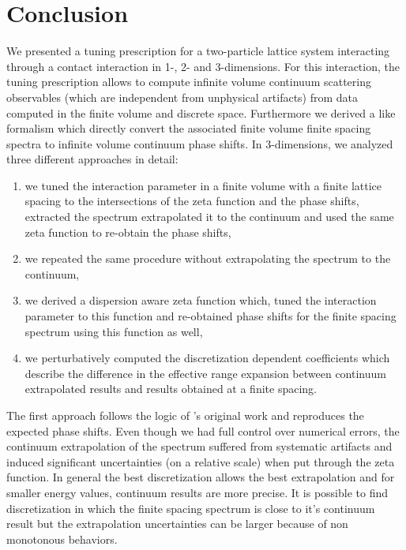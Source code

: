 \section{Conclusion}\label{sec:conclusion}

We presented a tuning prescription for a two-particle lattice system interacting through a contact interaction in 1-, 2- and 3-dimensions.
For this interaction, the tuning prescription allows to compute infinite volume continuum scattering observables (which are independent from unphysical artifacts) from data computed in the finite volume and discrete space.
Furthermore we derived a \Luscher like formalism which directly convert the associated finite volume finite spacing spectra to infinite volume continuum phase shifts.
In 3-dimensions, we analyzed three different approaches in detail:
\begin{enumerate}
	\item we tuned the interaction parameter in a finite volume with a finite lattice spacing to the intersections of the \Luscher zeta function and the phase shifts, extracted the spectrum extrapolated it to the continuum and used the same \Luscher zeta function to re-obtain the phase shifts,
	\item we repeated the same procedure without extrapolating the spectrum to the continuum,
	\item we derived a dispersion aware zeta function which, tuned the interaction parameter to this function and re-obtained phase shifts for the finite spacing spectrum using this function as well,
	\item we perturbatively computed the discretization dependent coefficients which describe the difference in the effective range expansion between continuum extrapolated results and results obtained at a finite spacing.
\end{enumerate}

The first approach follows the logic of \Luscher's original work and reproduces the expected phase shifts.
Even though we had full control over numerical errors, the continuum extrapolation of the spectrum suffered from systematic artifacts and induced significant uncertainties (on a relative scale) when put through the zeta function.
In general the best discretization allows the best extrapolation and for smaller energy values, continuum results are more precise.
It is possible to find discretization in which the finite spacing spectrum is close to it's continuum result but the extrapolation uncertainties can be larger because of non monotonous behaviors.

